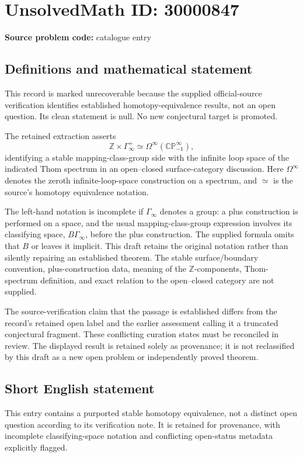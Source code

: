 \documentclass[11pt]{article}
\newcommand{\Z}{\mathbb{Z}}
\begin{document}
\section*{UnsolvedMath ID: 30000847}
\textbf{Source problem code:} catalogue entry
\subsection{Definitions and mathematical statement}
This record is marked unrecoverable because the supplied official-source verification identifies established homotopy-equivalence results, not an open question. Its clean statement is null. No new conjectural target is promoted.

The retained extraction asserts
\[
 \Z\times\Gamma_\infty^+
       \simeq\Omega^\infty(\mathbb{CP}_{-1}^{\infty}),
\]
identifying a stable mapping-class-group side with the infinite loop space of the indicated Thom spectrum in an open--closed surface-category discussion. Here $\Omega^\infty$ denotes the zeroth infinite-loop-space construction on a spectrum, and $\simeq$ is the source's homotopy equivalence notation.

The left-hand notation is incomplete if $\Gamma_\infty$ denotes a group: a plus construction is performed on a space, and the usual mapping-class-group expression involves its classifying space, $B\Gamma_\infty$, before the plus construction. The supplied formula omits that $B$ or leaves it implicit. This draft retains the original notation rather than silently repairing an established theorem. The stable surface/boundary convention, plus-construction data, meaning of the $\Z$-components, Thom-spectrum definition, and exact relation to the open--closed category are not supplied.

The source-verification claim that the passage is established differs from the record's retained open label and the earlier assessment calling it a truncated conjectural fragment. These conflicting curation states must be reconciled in review. The displayed result is retained solely as provenance; it is not reclassified by this draft as a new open problem or independently proved theorem.
\subsection{Short English statement}
This entry contains a purported stable homotopy equivalence, not a distinct open question according to its verification note. It is retained for provenance, with incomplete classifying-space notation and conflicting open-status metadata explicitly flagged.
\end{document}

